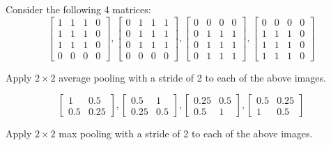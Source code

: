 Consider the following 4 matrices:
$$
\begin{bmatrix}
    1 & 1 & 1 & 0 \\
    1 & 1 & 1 & 0 \\
    1 & 1 & 1 & 0 \\
    0 & 0 & 0 & 0
\end{bmatrix},
%
\begin{bmatrix}
    0 & 1 & 1 & 1 \\
    0 & 1 & 1 & 1 \\
    0 & 1 & 1 & 1 \\
    0 & 0 & 0 & 0
\end{bmatrix},
%
\begin{bmatrix}
    0 & 0 & 0 & 0 \\
    0 & 1 & 1 & 1 \\
    0 & 1 & 1 & 1 \\
    0 & 1 & 1 & 1
\end{bmatrix},
%
\begin{bmatrix}
    0 & 0 & 0 & 0 \\
    1 & 1 & 1 & 0 \\
    1 & 1 & 1 & 0 \\
    1 & 1 & 1 & 0
\end{bmatrix}
$$
\problem[3]

Apply $2 \times 2$ average pooling with a stride of 2 to each of the above images.

\begin{solution}

\[
    \begin{bmatrix}
        1 & 0.5\\
        0.5 & 0.25
    \end{bmatrix},
    \begin{bmatrix}
        0.5 & 1\\
        0.25 & 0.5
    \end{bmatrix},
    \begin{bmatrix}
        0.25 & 0.5\\
        0.5 & 1
    \end{bmatrix},
    \begin{bmatrix}
        0.5 & 0.25\\
        1 & 0.5
    \end{bmatrix}
\]

\end{solution}

\problem[3]

Apply $2 \times 2$ max pooling with a stride of 2 to each of the above images.

